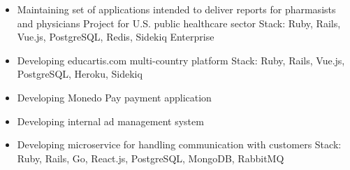 \documentclass[10pt,a4paper,ragged2e]{altacv}
\begin{document}

\begin{fullwidth}
\makecvheader
\end{fullwidth}



\begin{itemize}
\item Maintaining set of applications intended to deliver reports for pharmasists and physicians \newline
Project for U.S. public healthcare sector \newline
{\small Stack: Ruby, Rails, Vue.js, PostgreSQL, Redis, Sidekiq Enterprise}
\end{itemize}

\divider

\begin{itemize}
\item Developing educartis.com multi-country platform \newline
{\small Stack: Ruby, Rails, Vue.js, PostgreSQL, Heroku, Sidekiq}
\end{itemize}

\divider

\begin{itemize}
\item Developing Monedo Pay payment application
\item Developing internal ad management system
\item Developing microservice for handling communication with customers \newline
{\small Stack: Ruby, Rails, Go, React.js, PostgreSQL, MongoDB, RabbitMQ}
\end{itemize}
\end{document}
